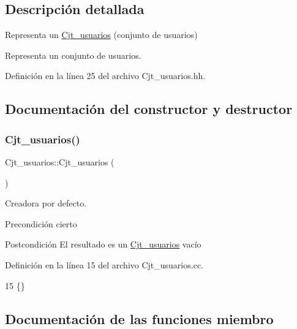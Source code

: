 \subsection{Descripción detallada}
Representa un \mbox{\hyperlink{class_cjt__usuarios}{Cjt\+\_\+usuarios}} (conjunto de usuarios) 

Representa un conjunto de usuarios. 

Definición en la línea 25 del archivo Cjt\+\_\+usuarios.\+hh.



\subsection{Documentación del constructor y destructor}
\mbox{\label{class_cjt__usuarios_ad51238f389a2c66291d9a1d7a81cb372}} 
\subsubsection{\texorpdfstring{Cjt\+\_\+usuarios()}{Cjt\_usuarios()}}
{\footnotesize\ttfamily Cjt\+\_\+usuarios\+::\+Cjt\+\_\+usuarios (\begin{DoxyParamCaption}{ }\end{DoxyParamCaption})}



Creadora por defecto. 

\begin{DoxyPrecond}{Precondición}
cierto 
\end{DoxyPrecond}
\begin{DoxyPostcond}{Postcondición}
El resultado es un \mbox{\hyperlink{class_cjt__usuarios}{Cjt\+\_\+usuarios}} vacío 
\end{DoxyPostcond}


Definición en la línea 15 del archivo Cjt\+\_\+usuarios.\+cc.


\begin{DoxyCode}
15 \{\}
\end{DoxyCode}


\subsection{Documentación de las funciones miembro}
\mbox{\label{class_cjt__usuarios_af2bc90f54125530ce07dde609dfbe43b}} 
